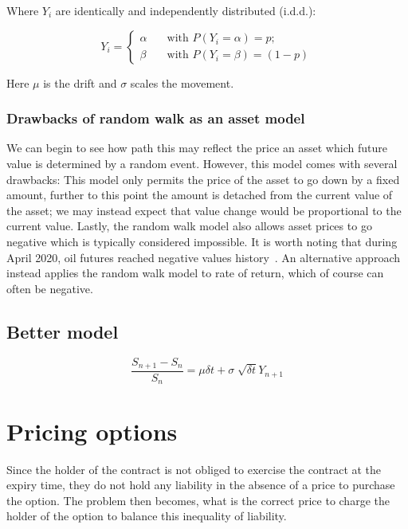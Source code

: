 Where \(Y_i\) are identically and independently distributed (i.d.d.):

\begin{equation*}
    Y_i = 
    \begin{cases}
       \alpha& \quad \text{with } P(Y_i = \alpha) = p; \\
       \beta& \quad \text{with } P(Y_i = \beta) = (1-p)
    \end{cases}
\end{equation*}

Here \(\mu \) is the drift and \(\sigma \) scales the movement.

\subsubsection{Drawbacks of random walk as an asset model}

We can begin to see how path this may reflect the price an asset which future value is determined by a random event. However, this model comes with several drawbacks: This model only permits the price of the asset to go down by a fixed amount, further to this point the amount is detached from the current value of the asset; we may instead expect that value change would be proportional to the current value. Lastly, the random walk model also allows asset prices to go negative which is typically considered impossible. It is worth noting that during April 2020, oil futures reached negative values history~\cite{NegativeOil}. An alternative approach instead applies the random walk model to rate of return, which of course can often be negative.

\subsection{Better model}

\begin{equation}
    \frac{S_{n+1} - S_n}{S_n} = \mu\delta t + \sigma\sqrt[]{\delta t}Y_{n+1}
\end{equation}

\section{Pricing options}

Since the holder of the contract is not obliged to exercise the contract at the expiry time, they do not hold any liability in the absence of a price to purchase the option. The problem then becomes, what is the correct price to charge the holder of the option to balance this inequality of liability.



